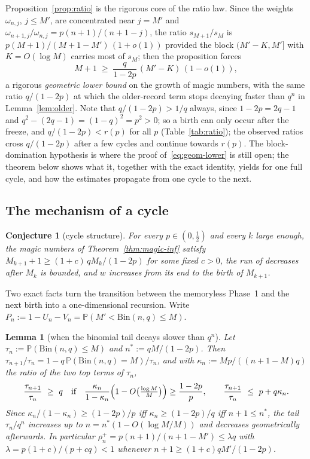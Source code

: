 \documentclass[11pt]{article}
\newtheorem{lemma}[theorem]{Lemma}
\newtheorem{conjecture}[theorem]{Conjecture}
\theoremstyle{definition}
\newcommand{\Bin}{\mathrm{Bin}}
\newcommand{\Prob}{\mathbb{P}}
\begin{document}
Proposition~\ref{prop:ratio} is the rigorous core of the ratio law.
Since the weights $\omega_{n,j}$, $j\le M'$, are concentrated near
$j=M'$ and $\omega_{n+1,j}/\omega_{n,j}=p(n+1)/(n+1-j)$, the ratio
$s_{M+1}/s_M$ is $p(M+1)/(M+1-M')\,(1+o(1))$ provided the block
$(M'-K,M']$ with $K=O(\log M)$ carries most of $s_M$; then the
proposition forces
\begin{equation}\label{eq:geom-lower}
  M+1\;\ge\;\frac{q}{1-2p}\,(M'-K)\,(1-o(1)),
\end{equation}
a rigorous \emph{geometric lower bound} on the growth of magic numbers,
with the same ratio $q/(1-2p)$ at which the older-record term stops
decaying faster than $q^n$ in Lemma~\ref{lem:older}.  Note that
$q/(1-2p)>1/q$ always, since $1-2p=2q-1$ and $q^2-(2q-1)=(1-q)^2=p^2>0$;
so a birth can only occur after the freeze, and
$q/(1-2p)<r(p)$ for all $p$ (Table~\ref{tab:ratio}); the observed
ratios cross $q/(1-2p)$ after a few cycles and continue towards
$r(p)$.  The block-domination
hypothesis is where the proof of~\eqref{eq:geom-lower} is still open;
the theorem below shows what it, together with the exact identity,
yields for one full cycle, and how the estimates propagate from one
cycle to the next.

\subsection{The mechanism of a cycle}\label{sec:mechanism}

\begin{conjecture}[cycle structure]\label{conj:cycle}
  For every $p\in(0,\tfrac12)$ and every $k$ large enough, the magic
  numbers of Theorem~\ref{thm:magic-inf} satisfy
  $M_{k+1}+1\ge(1+c)\,qM_k/(1-2p)$ for some fixed $c>0$, the run of
  decreases after $M_k$ is bounded, and $w$ increases from its end to
  the birth of $M_{k+1}$.
\end{conjecture}

Two exact facts turn the transition between the memoryless Phase~1
and the next birth into a one-dimensional recursion.  Write
$P_n:=1-U_n-V_n=\Prob(M'<\Bin(n,q)\le M)$.

\begin{lemma}[when the binomial tail decays slower than $q^n$]\label{lem:tailratio}
  Let $\tau_n:=\Prob(\Bin(n,q)\le M)$ and $n^*:=qM/(1-2p)$.  Then
  $\tau_{n+1}/\tau_n=1-q\,\Prob(\Bin(n,q)=M)/\tau_n$, and with
  $\kappa_n:=Mp/((n+1-M)q)$ the ratio of the two top terms of $\tau_n$,
  \[
    \frac{\tau_{n+1}}{\tau_n}\ \ge\ q \quad\text{if}\quad
    \frac{\kappa_n}{1-\kappa_n}\Bigl(1-O\bigl(\tfrac{\log M}{M}\bigr)\Bigr)\ge\frac{1-2p}{p},
    \qquad
    \frac{\tau_{n+1}}{\tau_n}\ \le\ p+q\kappa_n .
  \]
  Since $\kappa_n/(1-\kappa_n)\ge(1-2p)/p$ iff $\kappa_n\ge(1-2p)/q$ iff
  $n+1\le n^*$, the tail $\tau_n/q^n$ increases up to
  $n=n^*(1-O(\log M/M))$ and decreases geometrically afterwards.  In
  particular $\rho^+_n=p(n+1)/(n+1-M')\le\lambda q$ with
  $\lambda=p(1+c)/(p+cq)<1$ whenever $n+1\ge(1+c)qM'/(1-2p)$.
\end{lemma}
\end{document}
